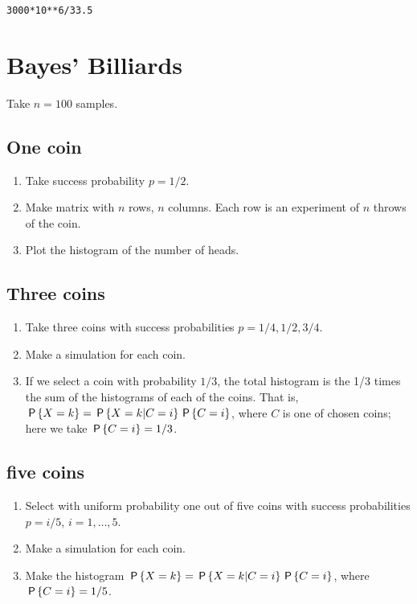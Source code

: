 \documentclass[a4paper]{article}
\begin{document}
\begin{verbatim}
3000*10**6/33.5
\end{verbatim}


\section{Bayes' Billiards}
\label{sec:orgf93559e}
Take \(n=100\) samples. 

\subsection{One coin}
\label{sec:org1e9a031}
\begin{enumerate}
\item Take success probability \(p=1/2\).
\item Make matrix with \(n\) rows, \(n\) columns. Each row is an experiment of \(n\) throws of the coin.
\item Plot the histogram of the number of heads.
\end{enumerate}

\subsection{Three coins}
\label{sec:orga657159}
\begin{enumerate}
\item Take three coins with success probabilities \(p=1/4, 1/2, 3/4\).
\item Make a simulation for each coin.
\item If we select a coin with probability \(1/3\), the total histogram is the 1/3 times the sum of the histograms of each of the coins. That is, \(\P{X=k} = \P{X=k|C = i}\P{C=i}\), where \(C\) is one of chosen coins;  here we take \(\P{C=i} = 1/3\).
\end{enumerate}

\subsection{five coins}
\label{sec:orga1a3b28}
\begin{enumerate}
\item Select with uniform probability one out of five coins with success probabilities \(p=i/5\),  \(i=1,\ldots, 5\).
\item Make a simulation for each coin.
\item Make the histogram \(\P{X=k} = \P{X=k|C = i}\P{C=i}\), where \(\P{C=i} = 1/5\).
\end{enumerate}
\end{document}
